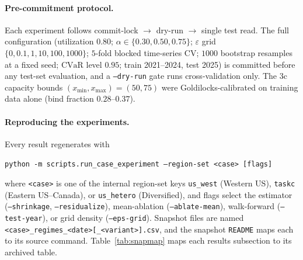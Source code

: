 \documentclass[10pt,twocolumn]{article}
\newcommand{\CVaR}{\mathrm{CVaR}}
\begin{document}
\paragraph{Pre-commitment protocol.} Each experiment follows commit-lock
$\rightarrow$ dry-run $\rightarrow$ single test read. The full configuration
(utilization $0.80$; $\alpha\in\{0.30,0.50,0.75\}$; $\varepsilon$ grid
$\{0,0.1,1,10,100,1000\}$; $5$-fold blocked time-series CV; $1000$ bootstrap
resamples at a fixed seed; $\CVaR$ level $0.95$; train 2021--2024, test 2025) is
committed before any test-set evaluation, and a \texttt{--dry-run} gate runs
cross-validation only. The 3c capacity bounds $(x_{\min},x_{\max})=(50,75)$ were
Goldilocks-calibrated on training data alone (bind fraction $0.28$--$0.37$).

\paragraph{Reproducing the experiments.} Every result regenerates with
\begin{center}
\texttt{python -m scripts.run\_case\_experiment --region-set <case> [flags]}
\end{center}
where \texttt{<case>} is one of the internal region-set keys \texttt{us\_west}
(Western US), \texttt{taskc} (Eastern US--Canada), or \texttt{us\_hetero}
(Diversified), and flags select the estimator (\texttt{--shrinkage},
\texttt{--residualize}), mean-ablation (\texttt{--ablate-mean}), walk-forward
(\texttt{--test-year}), or grid density (\texttt{--eps-grid}). Snapshot files are
named \texttt{<case>\_regimes\_<date>[\_<variant>].csv}, and the snapshot
\texttt{README} maps each to its source command.
Table~\ref{tab:snapmap} maps each results subsection to its archived table.
\end{document}
